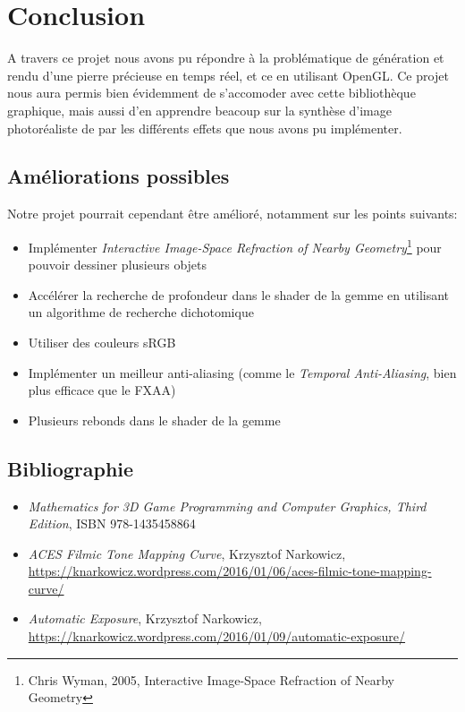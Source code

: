 \documentclass[a4paper,12pt]{article}
\begin{document}
\section{Conclusion}
A travers ce projet nous avons pu répondre à la problématique de génération et rendu d'une
pierre précieuse en temps réel, et ce en utilisant OpenGL. Ce projet nous aura permis bien
évidemment de s'accomoder avec cette bibliothèque graphique, mais aussi d'en apprendre beacoup
sur la synthèse d'image photoréaliste de par les différents effets que nous avons pu implémenter.

\subsection{Améliorations possibles}
Notre projet pourrait cependant être amélioré, notamment sur les points suivants:
\begin{itemize}
    \item Implémenter \emph{Interactive Image-Space Refraction of Nearby Geometry}\footnote{Chris Wyman, 2005, Interactive Image-Space Refraction of Nearby Geometry} pour pouvoir dessiner plusieurs objets
    \item Accélérer la recherche de profondeur dans le shader de la gemme en utilisant un algorithme de recherche dichotomique
    \item Utiliser des couleurs sRGB
    \item Implémenter un meilleur anti-aliasing (comme le \emph{Temporal Anti-Aliasing}, bien plus efficace que le FXAA)
    \item Plusieurs rebonds dans le shader de la gemme
\end{itemize}

\subsection{Bibliographie}
\begin{itemize}
    \item \emph{Mathematics for 3D Game Programming and Computer Graphics, Third Edition}, ISBN 978-1435458864
    \item \emph{ACES Filmic Tone Mapping Curve}, Krzysztof Narkowicz, \url{https://knarkowicz.wordpress.com/2016/01/06/aces-filmic-tone-mapping-curve/}
    \item \emph{Automatic Exposure}, Krzysztof Narkowicz, \url{https://knarkowicz.wordpress.com/2016/01/09/automatic-exposure/}
\end{itemize}
\end{document}
